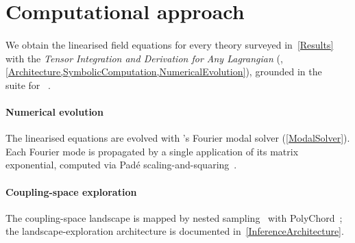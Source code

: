 %
%
%

\section{Computational approach}%
\label{ComputationalApproach}

\paragraph*{\TIDAL{}}
We obtain the linearised field equations for every theory surveyed
in~\cref{Results} with the \emph{Tensor Integration and Derivation
for Any Lagrangian} (\TIDAL{},
\cref{Architecture,SymbolicComputation,NumericalEvolution}), grounded
in the \xAct{}~\cite{martingarcia2007xact,martingarcia2008xperm} suite for
\Mathematica{}~\cite{mathematica}.

\paragraph*{Numerical evolution}
The linearised equations are evolved with \TIDAL{}'s Fourier modal
solver (\cref{ModalSolver}).
Each Fourier mode is propagated by a single application of its
matrix exponential, computed via Pad\'e
scaling-and-squaring~\cite{higham2009scaling}.

\paragraph*{Coupling-space exploration}
The coupling-space landscape is mapped by nested
sampling~\cite{Skilling:2006gxv} with
PolyChord~\cite{Handley:2015fda,Handley:2015vkr}; the
landscape-exploration architecture is documented
in~\cref{InferenceArchitecture}.
